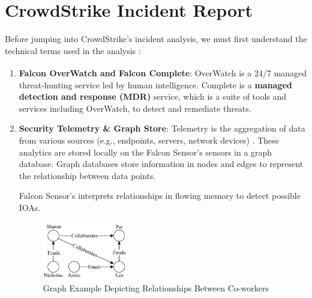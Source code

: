 \section{CrowdStrike Incident Report}

Before jumping into CrowdStrike's incident analysis, we must first understand the technical terms used in the analysis \cite{crowdstrikechannelfile291rca}:

\begin{enumerate}
     \item \textbf{Falcon OverWatch\textsuperscript{\textregistered} and Falcon Complete\textsuperscript{\texttrademark}}: OverWatch is a 24/7 managed threat-hunting service led by human intelligence. Complete is a \textbf{managed detection and response (MDR)} service, which is a suite of tools and services including OverWatch, to detect and remediate threats. \cite{cosive_falcon_complete}\cite{crowdstrike_falcon_complete}\cite{crowdstrike_overwatch}
     
     \item \textbf{Security Telemetry \& Graph Store}: Telemetry is the aggregation of data from various sources (e.g., endpoints, servers, network devices) \cite{proofpoint_telemetry}. These analytics are stored locally on the Falcon Sensor's sensors in a graph database. Graph databases store information in nodes and edges to represent the relationship between data points. \cite{oracle_graph_database}

     \newpage
     
     Falcon Sensor's interprets relationships in flowing memory to detect possible IOAs.\\
     \begin{figure}[h!]
        \vspace{-1em}
        \centering
        \includegraphics[width=0.35\textwidth]{Sections/crowd/graph.png}
        \caption{Graph Example Depicting Relationships Between Co-workers}
        \label{fig:graphdb}
        
        \vspace{-1em}
    \end{figure}
    

\end{enumerate}
